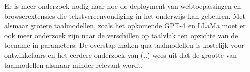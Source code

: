 
Er is meer onderzoek nodig naar hoe de deployment van webtoepassingen en browserextensies die tekstvereenvoudiging in het onderwijs kan gebeuren. Met alsmaar grotere taalmodellen, zoals het opkomende GPT-4 en LLaMa moet er ook meer onderzoek zijn naar de verschillen op taalvlak ten opzichte van de toename in parameters. De overstap maken qua taalmodellen is kostelijk voor ontwikkelaars en het eerdere onderzoek van (..) wees uit dat de grootte van taalmodellen alsmaar minder relevant wordt.